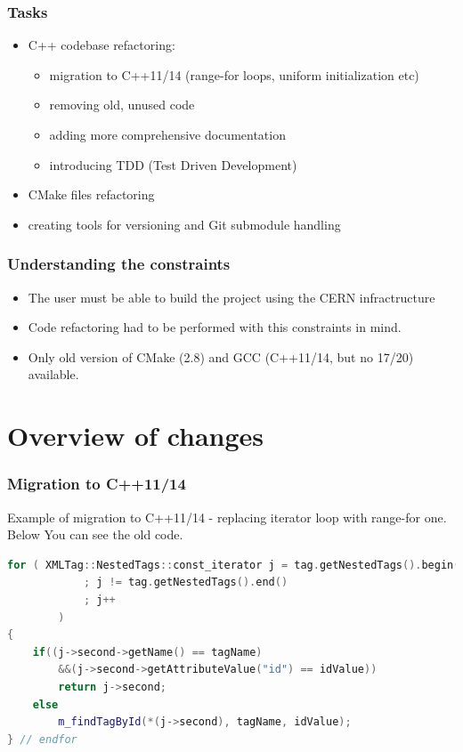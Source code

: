 \documentclass[10pt]{beamer}
\begin{document}
\begin{frame}
\frametitle{Tasks}
\begin{itemize}
    \item C++ codebase refactoring: \begin{itemize}
        \item migration to C++11/14 (range-for loops, uniform initialization etc)
        \item removing old, unused code 
        \item adding more comprehensive documentation
        \item introducing TDD (Test Driven Development)
    \end{itemize}
    \item CMake files refactoring
    \item creating tools for versioning and Git submodule handling
\end{itemize}
\end{frame}

\begin{frame}
\frametitle{Understanding the constraints}
\begin{itemize}
\item The user must be able to build the project using the CERN infractructure
\item Code refactoring had to be performed with this constraints in mind.
\item Only old version of CMake (2.8) and GCC (C++11/14, but no 17/20) available.
\end{itemize}
\end{frame}


\section {Overview of changes}


\begin{frame}[fragile]
\frametitle{Migration to C++11/14}
Example of migration to C++11/14 - replacing iterator loop with range-for one. Below You can see the old code.
\begin{lstlisting}[language=c++, caption={Example of old C++ code (before refactoring).}]
for ( XMLTag::NestedTags::const_iterator j = tag.getNestedTags().begin()
            ; j != tag.getNestedTags().end()
            ; j++
        )
{
    if((j->second->getName() == tagName)
        &&(j->second->getAttributeValue("id") == idValue))
        return j->second;
    else
        m_findTagById(*(j->second), tagName, idValue);		
} // endfor
\end{lstlisting}
\end{frame}
\end{document}
